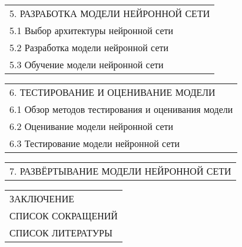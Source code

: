 \documentclass[12pt, А4]{article} %
\begin{document}
\begin{FlushLeft}
    \begin{tabular}{p{17.25cm}} %
        \textsf{5. РАЗРАБОТКА МОДЕЛИ НЕЙРОННОЙ СЕТИ} \vspace{1pt} \hline \\
        \hspace{0.5cm}\textsf{5.1 Выбор архитектуры нейронной сети} \vspace{1pt} \hline \\
        \hspace{0.5cm}\textsf{5.2 Разработка модели нейронной сети} \vspace{1pt} \hline \\
        \hspace{0.5cm}\textsf{5.3 Обучение модели нейронной сети} \vspace{1pt} \hline \\
    \end{tabular} %

    \begin{tabular}{p{17.25cm}} %
        \textsf{6. ТЕСТИРОВАНИЕ И ОЦЕНИВАНИЕ МОДЕЛИ} \vspace{1pt} \hline \\
        \hspace{0.5cm}\textsf{6.1 Обзор методов тестирования и оценивания модели} \vspace{1pt} \hline \\
        \hspace{0.5cm}\textsf{6.2 Оценивание модели нейронной сети} \vspace{1pt} \hline \\
        \hspace{0.5cm}\textsf{6.3 Тестирование модели нейронной сети} \vspace{1pt} \hline \\
    \end{tabular} %

    \begin{tabular}{p{17.25cm}} %
        \textsf{7. РАЗВЁРТЫВАНИЕ МОДЕЛИ НЕЙРОННОЙ СЕТИ} \vspace{1pt} \hline \\
    \end{tabular} %

    \begin{tabular}{p{17.25cm}} %
        \textsf{ЗАКЛЮЧЕНИЕ} \vspace{1pt} \hline \\
        \textsf{СПИСОК СОКРАЩЕНИЙ} \vspace{1pt} \hline \\
        \textsf{СПИСОК ЛИТЕРАТУРЫ} \vspace{1pt} \hline 
    \end{tabular} %


\end{FlushLeft}
\end{document}
